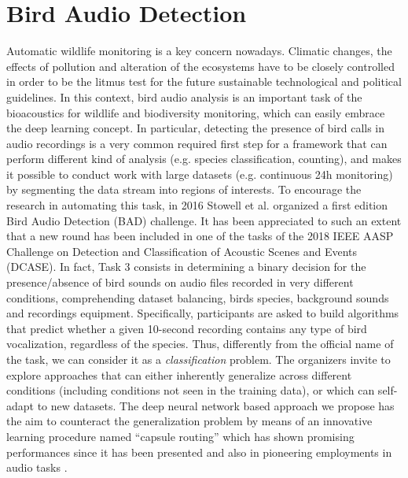 \newpage

\section{Bird Audio Detection}


Automatic wildlife monitoring is a key concern nowadays. Climatic changes, the effects of pollution and alteration of the ecosystems have to be closely controlled in order to be the litmus test for the future sustainable technological and political guidelines.
In this context, bird audio analysis is an important task of the bioacoustics for wildlife and biodiversity monitoring, which can easily embrace the deep learning concept.
In particular, detecting the presence of bird calls in audio recordings is a very common required first step for a framework that can perform different kind of  analysis (e.g. species classification, counting), and makes it possible to conduct work with large datasets (e.g. continuous 24h monitoring) by segmenting the data stream into regions of interests.
To encourage the research in automating this task, in 2016 Stowell et al. \cite{stowell2016bird} organized a first edition Bird Audio Detection (BAD) challenge. It has been appreciated to such an extent that a new round has been included in one of the tasks of the 2018 IEEE AASP Challenge on Detection and Classification of Acoustic Scenes and Events (DCASE). In fact, Task 3 consists in determining a binary decision for the presence/absence of bird sounds on audio files recorded in very different conditions, comprehending dataset balancing, birds species, background sounds and recordings equipment.
Specifically, participants are asked to build algorithms that predict whether a given 10-second recording contains any type of bird vocalization, regardless of the species. Thus, differently from the official name of the task, we can consider it as a \textit{classification} problem.
The organizers invite to explore approaches that can either inherently generalize across different conditions (including conditions not seen in the training data), or which can self-adapt to new datasets. The deep neural network based approach we propose has the aim to counteract the generalization problem by means of an innovative learning procedure named ``capsule routing'' which has shown promising performances since it has been presented \cite{sabour2017dynamic} and also in pioneering employments in audio tasks \cite{iqbal2018capsule}.


